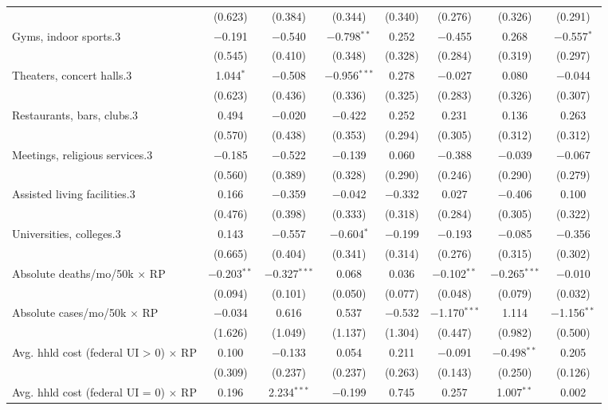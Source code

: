 \begin{table}[!htbp]
\begin{tabular}{@{\extracolsep{5pt}}lccccccc}
  & (0.623) & (0.384) & (0.344) & (0.340) & (0.276) & (0.326) & (0.291) \\ 
  Gyms, indoor sports.3 & $-$0.191 & $-$0.540 & $-$0.798$^{**}$ & 0.252 & $-$0.455 & 0.268 & $-$0.557$^{*}$ \\ 
  & (0.545) & (0.410) & (0.348) & (0.328) & (0.284) & (0.319) & (0.297) \\ 
  Theaters, concert halls.3 & 1.044$^{*}$ & $-$0.508 & $-$0.956$^{***}$ & 0.278 & $-$0.027 & 0.080 & $-$0.044 \\ 
  & (0.623) & (0.436) & (0.336) & (0.325) & (0.283) & (0.326) & (0.307) \\ 
  Restaurants, bars, clubs.3 & 0.494 & $-$0.020 & $-$0.422 & 0.252 & 0.231 & 0.136 & 0.263 \\ 
  & (0.570) & (0.438) & (0.353) & (0.294) & (0.305) & (0.312) & (0.312) \\ 
  Meetings, religious services.3 & $-$0.185 & $-$0.522 & $-$0.139 & 0.060 & $-$0.388 & $-$0.039 & $-$0.067 \\ 
  & (0.560) & (0.389) & (0.328) & (0.290) & (0.246) & (0.290) & (0.279) \\ 
  Assisted living facilities.3 & 0.166 & $-$0.359 & $-$0.042 & $-$0.332 & 0.027 & $-$0.406 & 0.100 \\ 
  & (0.476) & (0.398) & (0.333) & (0.318) & (0.284) & (0.305) & (0.322) \\ 
  Universities, colleges.3 & 0.143 & $-$0.557 & $-$0.604$^{*}$ & $-$0.199 & $-$0.193 & $-$0.085 & $-$0.356 \\ 
  & (0.665) & (0.404) & (0.341) & (0.314) & (0.276) & (0.315) & (0.302) \\ 
  Absolute deaths/mo/50k $\times$ RP & $-$0.203$^{**}$ & $-$0.327$^{***}$ & 0.068 & 0.036 & $-$0.102$^{**}$ & $-$0.265$^{***}$ & $-$0.010 \\ 
  & (0.094) & (0.101) & (0.050) & (0.077) & (0.048) & (0.079) & (0.032) \\ 
  Absolute cases/mo/50k $\times$ RP & $-$0.034 & 0.616 & 0.537 & $-$0.532 & $-$1.170$^{***}$ & 1.114 & $-$1.156$^{**}$ \\ 
  & (1.626) & (1.049) & (1.137) & (1.304) & (0.447) & (0.982) & (0.500) \\ 
  Avg. hhld cost (federal UI > 0) $\times$ RP & 0.100 & $-$0.133 & 0.054 & 0.211 & $-$0.091 & $-$0.498$^{**}$ & 0.205 \\ 
  & (0.309) & (0.237) & (0.237) & (0.263) & (0.143) & (0.250) & (0.126) \\ 
  Avg. hhld cost (federal UI = 0) $\times$ RP & 0.196 & 2.234$^{***}$ & $-$0.199 & 0.745 & 0.257 & 1.007$^{**}$ & 0.002 \\ 

\end{tabular}
\end{table}
